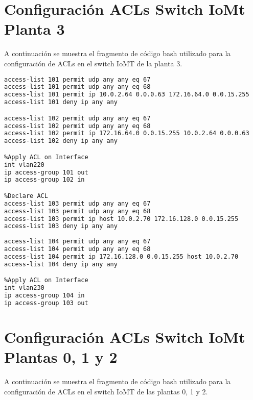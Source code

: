 \section{Configuración ACLs Switch IoMt Planta 3}\label{anexo:aclIoMTP3}
A continuación se muestra el fragmento de código bash utilizado para la configuración de ACLs en el switch IoMT de la planta 3.

\begin{lstlisting}[language=Bash, caption={Configuración ACLs Switch IoMt Planta 3}]
%Declare ACL
access-list 101 permit udp any any eq 67            
access-list 101 permit udp any any eq 68
access-list 101 permit ip 10.0.2.64 0.0.0.63 172.16.64.0 0.0.15.255
access-list 101 deny ip any any

access-list 102 permit udp any any eq 67            
access-list 102 permit udp any any eq 68
access-list 102 permit ip 172.16.64.0 0.0.15.255 10.0.2.64 0.0.0.63
access-list 102 deny ip any any

%Apply ACL on Interface
int vlan220
ip access-group 101 out
ip access-group 102 in

%Declare ACL
access-list 103 permit udp any any eq 67            
access-list 103 permit udp any any eq 68
access-list 103 permit ip host 10.0.2.70 172.16.128.0 0.0.15.255
access-list 103 deny ip any any
     
access-list 104 permit udp any any eq 67            
access-list 104 permit udp any any eq 68        
access-list 104 permit ip 172.16.128.0 0.0.15.255 host 10.0.2.70
access-list 104 deny ip any any

%Apply ACL on Interface
int vlan230
ip access-group 104 in
ip access-group 103 out
\end{lstlisting}

\section{Configuración ACLs Switch IoMt Plantas 0, 1 y 2}\label{anexo:aclIoMTP012}
A continuación se muestra el fragmento de código bash utilizado para la configuración de ACLs en el switch IoMT de las plantas 0, 1 y 2.

